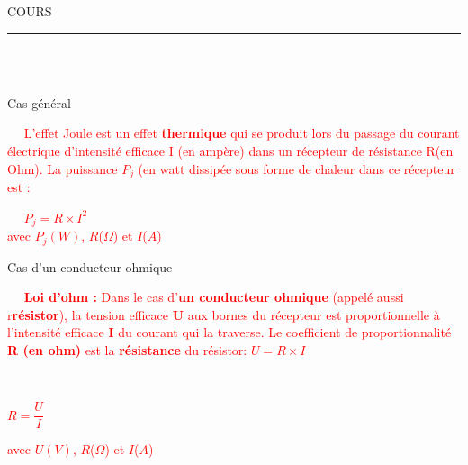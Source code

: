 \documentclass[11pt,a4paper]{article}
\newenvironment{itemize*}%
    {\begin{itemize}%
      \setlength{\itemsep}{0pt}%
      \setlength{\parskip}{0pt}}%
    {\end{itemize}}
\newcommand{\ctext}[1]
{\begin{bclogo}[couleur = white,logo= , arrondi = 0.1,barre=none]
{}
\vspace{-8mm}
~~
\textcolor{red}{#1}
~~
\end{bclogo}}
\begin{document}
\begin{center}
 \LARGE{COURS } \\[3mm]
\end{center}



\normalsize

\hrule\
\\[0,5cm]


\\
\vspace{-3mm}
\begin{itemize*}
\item Cas général



\noindent%
\begin{minipage}{.65\textwidth}%
 \ctext{
 L'effet Joule est un effet \textbf{thermique} qui se produit lors du passage du courant électrique d'intensité efficace I (en ampère) dans un récepteur de résistance R(en Ohm). La puissance $P_j$ (en watt dissipée sous forme de chaleur dans ce récepteur est :  
 }
\end{minipage}%
\hfill
\begin{minipage}{.27\textwidth}%
\ctext{
\LARGE{$P_j=R \times I^2$}\\[3mm]
\normalsize
avec $P_j(W)$, $R$($\Omega$) et $I$($A$)
}
\end{minipage}%


\item Cas d'un conducteur ohmique \\
\vspace{-5mm}
\noindent%
\begin{fleche}
\item 
\begin{minipage}{.60\textwidth}%
 \ctext{
 \textbf{Loi d'ohm :} Dans le cas d'\textbf{un conducteur ohmique} (appelé aussi r\textbf{résistor}), la tension efficace \textbf{U} aux bornes  du récepteur est proportionnelle à l'intensité efficace \textbf{I} du courant qui la traverse. Le coefficient de proportionnalité \textbf{R (en ohm) }est la \textbf{résistance} du résistor: \Large{$U=R \times I$} 
 }
\end{minipage}%
\hfill
\begin{minipage}{.27\textwidth}%
\ctext{
\begin{center}
   \Large{$R = \dfrac{U}{I}$}
\end{center}
\normalsize
\vspace{2mm}
avec $U(V)$, $R$($\Omega$) et $I$($A$)
}
\end{minipage}%



\end{fleche}
\end{itemize*}
\end{document}
